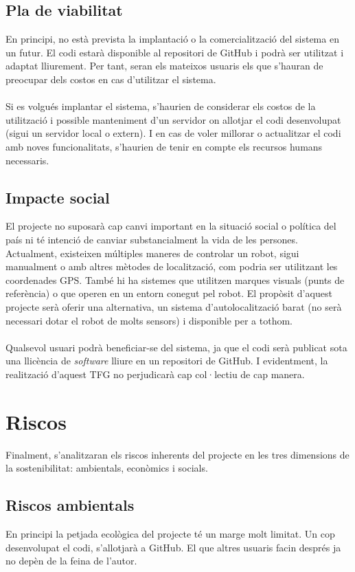 	\subsection{Pla de viabilitat}
		En principi, no està prevista la implantació o la comercialització del sistema en un futur. El codi estarà disponible al repositori de GitHub i podrà ser utilitzat i adaptat lliurement. Per tant,
		seran els mateixos usuaris els que s'hauran de preocupar dels costos en cas d'utilitzar el sistema.\\\\
		Si es volgués implantar el sistema, s'haurien de considerar els costos de la utilització i possible manteniment d'un servidor on allotjar el codi desenvolupat (sigui un servidor local o extern). I en
		cas de voler millorar o actualitzar el codi amb noves funcionalitats, s'haurien de tenir en compte els recursos humans necessaris.

	\subsection{Impacte social}
		El projecte no suposarà cap canvi important en la situació social o política del país ni té intenció de canviar substancialment la vida de les persones. Actualment, existeixen múltiples maneres de
		controlar un robot, sigui manualment o amb altres mètodes de localització, com podria ser utilitzant les coordenades GPS. També hi ha sistemes que utilitzen marques visuals (punts de referència)
		o que operen en un entorn conegut pel robot. El propòsit d'aquest projecte serà oferir una alternativa, un sistema d'autolocalització barat (no serà necessari dotar el robot de molts sensors)
		i disponible per a tothom.\\\\
		Qualsevol usuari podrà beneficiar-se del sistema, ja que el codi serà publicat sota una llicència de \textit{software} lliure en un repositori de GitHub. I evidentment, la realització d'aquest TFG
		no perjudicarà cap col·lectiu de cap manera.

\section{Riscos}
	Finalment, s'analitzaran els riscos inherents del projecte en les tres dimensions de la sostenibilitat: ambientals, econòmics i socials.
	\subsection{Riscos ambientals}
		En principi la petjada ecològica del projecte té un marge molt limitat. Un cop desenvolupat el codi, s'allotjarà a GitHub. El que altres usuaris facin després ja no depèn de la feina de l'autor.

